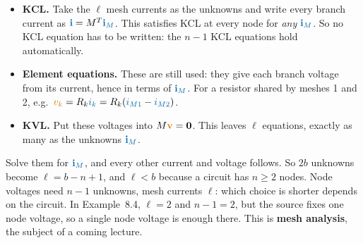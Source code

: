 \documentclass[11pt,a4paper]{article}
\newcommand{\Icol}[1]{\textcolor{ccur}{#1}}
\newcommand{\Vcol}[1]{\textcolor{cvolt}{#1}}
\begin{document}
\begin{center}
\end{center}

\begin{itemize}
  \item \textbf{KCL.} Take the $\ell$ mesh currents as the unknowns and write every branch
        current as $\Icol{\mathbf{i}} = M^T\Icol{\mathbf{i}_M}$. This satisfies KCL at every
        node for \emph{any} $\Icol{\mathbf{i}_M}$. So no KCL equation has to be written: the
        $n-1$ KCL equations hold automatically.
  \item \textbf{Element equations.} These are still used: they give each branch voltage from
        its current, hence in terms of $\Icol{\mathbf{i}_M}$. For a resistor shared by meshes
        1 and 2, e.g.\ $\Vcol{v_k} = R_k\Icol{i_k} = R_k(\Icol{i_{M1}} - \Icol{i_{M2}})$.
  \item \textbf{KVL.} Put these voltages into $M\Vcol{\mathbf{v}} = \mathbf{0}$. This leaves
        $\ell$ equations, exactly as many as the unknowns $\Icol{\mathbf{i}_M}$.
\end{itemize}
Solve them for $\Icol{\mathbf{i}_M}$, and every other current and voltage follows. So $2b$
unknowns become $\ell = b - n + 1$, and $\ell < b$ because a circuit has $n \ge 2$ nodes.
Node voltages need $n - 1$ unknowns, mesh currents $\ell$: which choice is shorter depends
on the circuit. In Example~8.4, $\ell = 2$ and $n - 1 = 2$, but the source fixes one node
voltage, so a single node voltage is enough there. This is \textbf{mesh analysis}, the subject of a coming
lecture.
\end{document}

